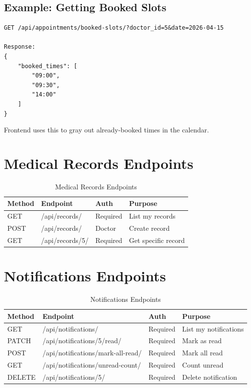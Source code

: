 \documentclass[11pt,a4paper,twoside]{report}
\begin{document}
\subsection{Example: Getting Booked Slots}

\begin{lstlisting}
GET /api/appointments/booked-slots/?doctor_id=5&date=2026-04-15

Response:
{
    "booked_times": [
        "09:00",
        "09:30",
        "14:00"
    ]
}
\end{lstlisting}

Frontend uses this to gray out already-booked times in the calendar.

\section{Medical Records Endpoints}

\begin{table}[H]
\centering
\small
\begin{tabular}{|l|l|p{3cm}|p{3cm}|}
\hline
\textbf{Method} & \textbf{Endpoint} & \textbf{Auth} & \textbf{Purpose} \\
\hline
GET & /api/records/ & Required & List my records \\
\hline
POST & /api/records/ & Doctor & Create record \\
\hline
GET & /api/records/5/ & Required & Get specific record \\
\hline
\end{tabular}
\caption{Medical Records Endpoints}
\end{table}

\section{Notifications Endpoints}

\begin{table}[H]
\centering
\small
\begin{tabular}{|l|l|p{2.5cm}|p{3cm}|}
\hline
\textbf{Method} & \textbf{Endpoint} & \textbf{Auth} & \textbf{Purpose} \\
\hline
GET & /api/notifications/ & Required & List my notifications \\
\hline
PATCH & /api/notifications/5/read/ & Required & Mark as read \\
\hline
POST & /api/notifications/mark-all-read/ & Required & Mark all read \\
\hline
GET & /api/notifications/unread-count/ & Required & Count unread \\
\hline
DELETE & /api/notifications/5/ & Required & Delete notification \\
\hline
\end{tabular}
\caption{Notifications Endpoints}
\end{table}
\end{document}
